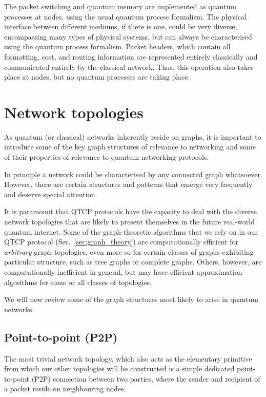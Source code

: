 \documentclass[aps, rmp, twocolumn, amsmath, amssymb, nofootinbib, superscriptaddress, longbibliography, floatfix, table-of-contents, eqsecnum]{revtex4-1}
\begin{document}
The packet switching and quantum memory are implemented as quantum processes at nodes, using the usual quantum process formalism. The physical interface between different mediums, if there is one, could be very diverse, encompassing many types of physical systems, but can always be characterised using the quantum process formalism. Packet headers, which contain all formatting, cost, and routing information are represented entirely classically and communicated entirely by the classical network. Thus, this operation also takes place at nodes, but no quantum processes are taking place.

%
%

\section{Network topologies} 

As quantum (or classical) networks inherently reside on graphs, it is important to introduce some of the key graph structures of relevance to networking and some of their properties of relevance to quantum networking protocols.

In principle a network could be characterised by any connected graph whatsoever. However, there are certain structures and patterns that emerge very frequently and deserve special attention.

It is paramount that QTCP protocols have the capacity to deal with the diverse network topologies that are likely to present themselves in the future real-world quantum internet. Some of the graph-theoretic algorithms that we rely on in our QTCP protocol (Sec.~\ref{sec:graph_theory}) are computationally efficient for \textit{arbitrary} graph topologies, even more so for certain classes of graphs exhibiting particular structure, such as tree graphs or complete graphs. Others, however, are computationally inefficient in general, but may have efficient approximation algorithms for some or all classes of topologies.

We will now review some of the graph structures most likely to arise in quantum networks.

%
%

\subsection{Point-to-point (P2P)} 

The most trivial network topology, which also acts as the elementary primitive from which our other topologies will be constructed is a simple dedicated point-to-point (P2P) connection between two parties, where the sender and recipient of a packet reside on neighbouring nodes.
\end{document}
